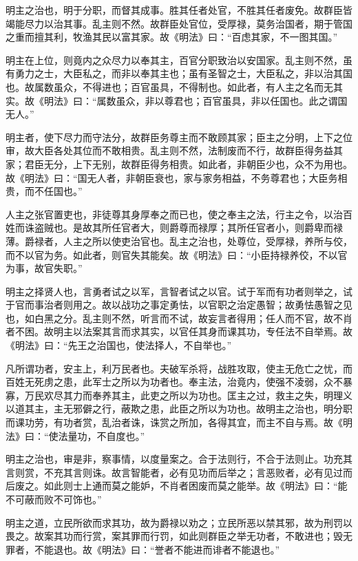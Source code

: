 \documentclass[]{article}
\begin{document}
明主之治也，明于分职，而督其成事。胜其任者处官，不胜其任者废免。故群臣皆竭能尽力以治其事。乱主则不然。故群臣处官位，受厚禄，莫务治国者，期于管国之重而擅其利，牧渔其民以富其家。故《明法》曰：``百虑其家，不一图其国。''

明主在上位，则竟内之众尽力以奉其主，百官分职致治以安国家。乱主则不然，虽有勇力之士，大臣私之，而非以奉其主也；虽有圣智之士，大臣私之，非以治其国也。故属数虽众，不得进也；百官虽具，不得制也。如此者，有人主之名而无其实。故《明法》曰：``属数虽众，非以尊君也；百官虽具，非以任国也。此之谓国无人。''

明主者，使下尽力而守法分，故群臣务尊主而不敢顾其家；臣主之分明，上下之位审，故大臣各处其位而不敢相贵。乱主则不然，法制废而不行，故群臣得务益其家；君臣无分，上下无别，故群臣得务相贵。如此者，非朝臣少也，众不为用也。故《明法》曰：``国无人者，非朝臣衰也，家与家务相益，不务尊君也；大臣务相贵，而不任国也。''

人主之张官置吏也，非徒尊其身厚奉之而已也，使之奉主之法，行主之令，以治百姓而诛盗贼也。是故其所任官者大，则爵尊而禄厚；其所任官者小，则爵卑而禄薄。爵禄者，人主之所以使吏治官也。乱主之治也，处尊位，受厚禄，养所与佼，而不以官为务。如此者，则官失其能矣。故《明法》曰：``小臣持禄养佼，不以官为事，故官失职。''

明主之择贤人也，言勇者试之以军，言智者试之以官。试于军而有功者则举之，试于官而事治者则用之。故以战功之事定勇怯，以官职之治定愚智；故勇怯愚智之见也，如白黑之分。乱主则不然，听言而不试，故妄言者得用；任人而不官，故不肖者不困。故明主以法案其言而求其实，以官任其身而课其功，专任法不自举焉。故《明法》曰：``先王之治国也，使法择人，不自举也。''

凡所谓功者，安主上，利万民者也。夫破军杀将，战胜攻取，使主无危亡之忧，而百姓无死虏之患，此军士之所以为功者也。奉主法，治竟内，使强不凌弱，众不暴寡，万民欢尽其力而奉养其主，此吏之所以为功也。匡主之过，救主之失，明理义以道其主，主无邪僻之行，蔽欺之患，此臣之所以为功也。故明主之治也，明分职而课功劳，有功者赏，乱治者诛，诛赏之所加，各得其宜，而主不自与焉。故《明法》曰：``使法量功，不自度也。''

明主之治也，审是非，察事情，以度量案之。合于法则行，不合于法则止。功充其言则赏，不充其言则诛。故言智能者，必有见功而后举之；言恶败者，必有见过而后废之。如此则士上通而莫之能妒，不肖者困废而莫之能举。故《明法》曰：``能不可蔽而败不可饰也。''

明主之道，立民所欲而求其功，故为爵禄以劝之；立民所恶以禁其邪，故为刑罚以畏之。故案其功而行赏，案其罪而行罚，如此则群臣之举无功者，不敢进也；毁无罪者，不能退也。故《明法》曰：``誉者不能进而诽者不能退也。''
\end{document}

